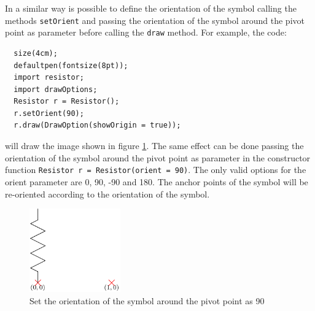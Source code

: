 \documentclass[a4paper,12pt]{report}
\begin{document}
In a similar way is possible to define the orientation of the symbol calling the methods \texttt{setOrient} and passing the orientation of the symbol around the pivot point as parameter before calling the \texttt{draw} method. For example, the code:
\begin{lstlisting}
  size(4cm);
  defaultpen(fontsize(8pt));
  import resistor;
  import drawOptions;
  Resistor r = Resistor();
  r.setOrient(90);
  r.draw(DrawOption(showOrigin = true));
\end{lstlisting}
will draw the image shown in figure \ref{fig:placingExample2}. The same effect can be done passing the orientation of the symbol around the pivot point as parameter in the constructor function \texttt{Resistor r = Resistor(orient = 90)}. The only valid options for the orient parameter are 0, 90, -90  and 180. The anchor points of the symbol will be re-oriented according to the orientation of the symbol.
\begin{figure}[ht]
  \centering
  \includegraphics[width=0.35\textwidth]{placingExample2.pdf}
  \caption{Set the orientation of the symbol around the pivot point as 90}
  \label{fig:placingExample2}
\end{figure}
\end{document}
